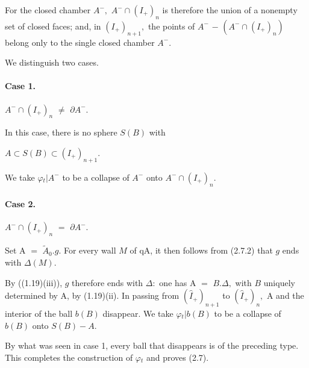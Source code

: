 \documentclass[10pt,a4paper]{article}
\begin{document}
For the closed chamber \ensuremath{A^{-},} \ensuremath{A^{-}\cap{}(I_+)_n} is therefore the union of a nonempty set of closed faces; and, in \ensuremath{(I_+)_{n+1},} the points of \ensuremath{A^{-}} \ensuremath{-} \ensuremath{(A^{-}\cap{}(I_+)_n)} belong only to the single closed chamber \ensuremath{A^{-}.}\par

We distinguish two cases.\par

\paragraph{Case 1.} \ensuremath{A^{-}\cap{}(I_+)_n} \ensuremath{\ne{}} \ensuremath{\partial{}A^{-}.}

In this case, there is no sphere \ensuremath{S(B)} with\par

\ensuremath{A\subset{}S(B)\subset{}(I_+)_{n+1}.}\par

We take \ensuremath{\varphi{}_t|A^{-}} to be a collapse of \ensuremath{A^{-}} onto \ensuremath{A^{-}\cap{}(I_+)_n.}\par

\paragraph{Case 2.} \ensuremath{A^{-}\cap{}(I_+)_n} \ensuremath{=} \ensuremath{\partial{}A^{-}.}

Set A \ensuremath{=} \ensuremath{\widetilde{A}_0.g.} For every wall \ensuremath{M} of qA, it then follows from (2.7.2) that \ensuremath{g} ends with \ensuremath{\Delta{}(M).}\par

By ((1.19)(iii)), \ensuremath{g} therefore ends with \ensuremath{\Delta{}:} one has A \ensuremath{=} \ensuremath{B.\Delta{},} with \ensuremath{B} uniquely determined by A, by (1.19)(ii). In passing from \ensuremath{(\widehat{I}_+)_{n+1}} to \ensuremath{(\widehat{I}_+)_n,} A and the interior of the ball \ensuremath{b(B)} disappear. We take \ensuremath{\varphi{}_t|b(B)} to be a collapse of \ensuremath{b(B)} onto \ensuremath{S(B)-A.}\par

By what was seen in case 1, every ball that disappears is of the preceding type. This completes the construction of \ensuremath{\varphi{}_t} and proves (2.7).\par
\end{document}
